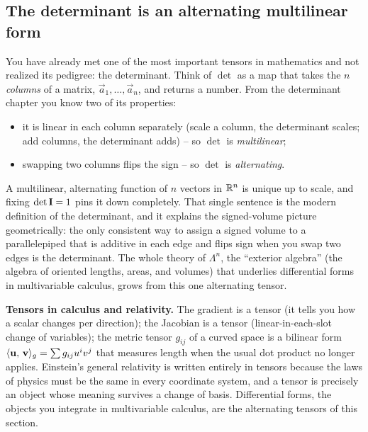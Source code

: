 \subsection{The determinant is an alternating multilinear form}
\label{ch37:det-tensor}

You have already met one of the most important tensors in mathematics and not
realized its pedigree: the determinant. Think of $\det$ as a map that takes the
$n$ \emph{columns} of a matrix, $\vec{a}_1,\dots,\vec{a}_n$, and returns a number.
From the determinant chapter you know two of its properties:
\begin{itemize}
  \item it is linear in each column separately (scale a column, the determinant
        scales; add columns, the determinant adds) -- so $\det$ is
        \emph{multilinear};
  \item swapping two columns flips the sign -- so $\det$ is \emph{alternating}.
\end{itemize}
A multilinear, alternating function of $n$ vectors in $\mathbb{R}^n$ is unique up to scale,
and fixing $\det\mathbf{I}=1$ pins it down completely. That single sentence is the
modern definition of the determinant, and it explains the signed-volume picture
geometrically: the only consistent way to assign a signed volume to a parallelepiped
that is additive in each edge and flips sign when you swap two edges is the
determinant. The whole theory of $\Lambda^n$, the ``exterior algebra'' (the algebra
of oriented lengths, areas, and volumes) that underlies differential forms in
multivariable calculus, grows from this one alternating tensor.

\begin{connectionbox}
\textbf{Tensors in calculus and relativity.} The gradient is a tensor (it tells you
how a scalar changes per direction); the Jacobian is a tensor (linear-in-each-slot
change of variables); the metric tensor $g_{ij}$ of a curved space is a bilinear
form $\langle \mathbf{u},\, \mathbf{v} \rangle_g = \sum g_{ij}u^i v^j$ that measures length when the
usual dot product no longer applies. Einstein's general relativity is written
entirely in tensors because the laws of physics must be the same in every coordinate
system, and a tensor is precisely an object whose meaning survives a change of
basis. Differential forms, the objects you integrate in multivariable calculus, are
the alternating tensors of this section.
\end{connectionbox}


